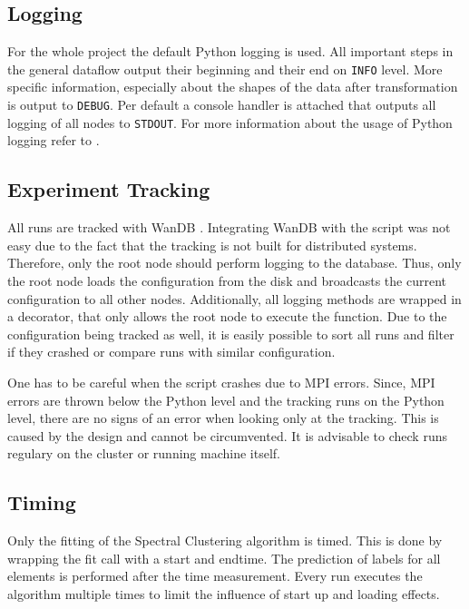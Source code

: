 \subsection{Logging}
\label{subsec:logging}
For the whole project the default Python logging \cite{noauthor_pep_nodate} is used.
All important steps in the general dataflow output their beginning and their end on \lstinline{INFO} level.
More specific information, especially about the shapes of the data after transformation is output to \lstinline{DEBUG}.
Per default a console handler is attached that outputs all logging of all nodes to \lstinline{STDOUT}.
For more information about the usage of Python logging refer to \cite{noauthor_pep_nodate}.


\subsection{Experiment Tracking}
\label{subsec:experiment_tracking}
All runs are tracked with WanDB \cite{noauthor_weights_nodate}. Integrating WanDB with the script was not easy due
to the fact that the tracking is not built for distributed systems. Therefore, only the root node should perform
logging to the database.
Thus, only the root node loads the configuration from the disk and broadcasts the current configuration
to all other nodes.
Additionally, all logging methods are wrapped in a decorator, that only allows the root node to execute the function.
Due to the configuration being tracked as well, it is easily possible to sort all runs and filter if they crashed or
compare runs with similar configuration.

One has to be careful when the script crashes due to \gls{MPI} errors. Since, \gls{MPI} errors are thrown
below the Python level and the tracking runs on the Python level, there are no signs of an error when looking only at
the tracking. This is caused by the design and cannot be circumvented. It is advisable to check runs regulary on
the cluster or running machine itself.

\subsection{Timing}
\label{subsec:timing}
Only the fitting of the Spectral Clustering algorithm is timed. This is done by wrapping the fit call with a start
and endtime. The prediction of labels for all elements is performed after the time measurement.
Every run executes the algorithm multiple times to limit the influence of start up and loading effects.
